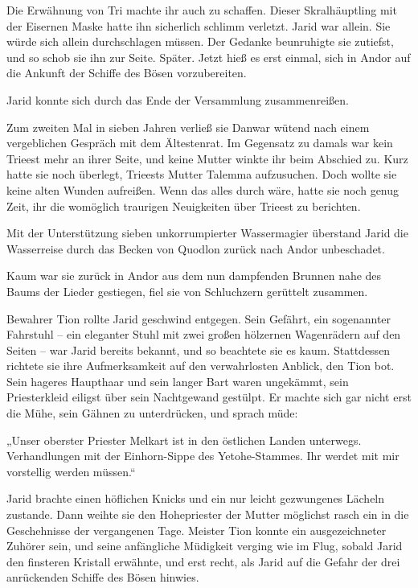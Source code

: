 Die Erwähnung von Tri machte ihr auch zu schaffen. Dieser Skralhäuptling mit der Eisernen Maske hatte ihn sicherlich schlimm verletzt. Jarid war allein. Sie würde sich allein durchschlagen müssen. Der Gedanke beunruhigte sie zutiefst, und so schob sie ihn zur Seite. Später. Jetzt hieß es erst einmal, sich in Andor auf die Ankunft der Schiffe des Bösen vorzubereiten.

Jarid konnte sich durch das Ende der Versammlung zusammenreißen.

Zum zweiten Mal in sieben Jahren verließ sie Danwar wütend nach einem vergeblichen Gespräch mit dem Ältestenrat. Im Gegensatz zu damals war kein Trieest mehr an ihrer Seite, und keine Mutter winkte ihr beim Abschied zu. Kurz hatte sie noch überlegt, Trieests Mutter Talemma aufzusuchen. Doch wollte sie keine alten Wunden aufreißen. Wenn das alles durch wäre, hatte sie noch genug Zeit, ihr die womöglich traurigen Neuigkeiten über Trieest zu berichten.

Mit der Unterstützung sieben unkorrumpierter Wassermagier überstand Jarid die Wasserreise durch das Becken von Quodlon zurück nach Andor unbeschadet.

Kaum war sie zurück in Andor aus dem nun dampfenden Brunnen nahe des Baums der Lieder gestiegen, fiel sie von Schluchzern gerüttelt zusammen.



\trennzeichen



Bewahrer Tion rollte Jarid geschwind entgegen. Sein Gefährt, ein sogenannter Fahrstuhl – ein eleganter Stuhl mit zwei großen hölzernen Wagenrädern auf den Seiten – war Jarid bereits bekannt, und so beachtete sie es kaum. Stattdessen richtete sie ihre Aufmerksamkeit auf den verwahrlosten Anblick, den Tion bot. Sein hageres Haupthaar und sein langer Bart waren ungekämmt, sein Priesterkleid eiligst über sein Nachtgewand gestülpt. Er machte sich gar nicht erst die Mühe, sein Gähnen zu unterdrücken, und sprach müde:

„Unser oberster Priester Melkart ist in den östlichen Landen unterwegs. Verhandlungen mit der Einhorn-Sippe des Yetohe-Stammes. Ihr werdet mit mir vorstellig werden müssen.“

Jarid brachte einen höflichen Knicks und ein nur leicht gezwungenes Lächeln zustande. Dann weihte sie den Hohepriester der Mutter möglichst rasch ein in die Geschehnisse der vergangenen Tage. Meister Tion konnte ein ausgezeichneter Zuhörer sein, und seine anfängliche Müdigkeit verging wie im Flug, sobald Jarid den finsteren Kristall erwähnte, und erst recht, als Jarid auf die Gefahr der drei anrückenden Schiffe des Bösen hinwies.

